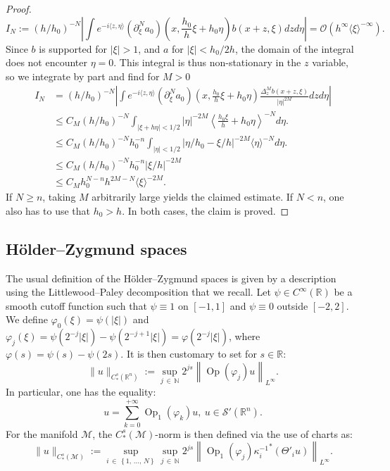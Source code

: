 \documentclass[10pt]{amsart}
\theoremstyle{definition}\newtheorem{defi}[theo]{Definition}\newtheorem{rema}[theo]{Remark}\newtheorem{exam}[theo]{Example}\newtheorem{exem}[theo]{Example}\newtheorem{nota}[theo]{Notation}
\newcommand{\R}{\mathbb{R}}
\newcommand{\N}{\mathbb{N}}
\newcommand{\M}{\mathcal{M}}
\newcommand{\clO}{\mathcal{O}}
\newcommand{\clS}{\mathcal{S}}
\DeclareMathOperator{\Op}{Op}
\begin{document}
\begin{proof}
\[
I_N :=(h/h_0)^{-N}\left| \int e^{-i \langle z, \eta \rangle } \left(\partial_\xi^N a_0\right)\left(x, \frac{h_0}{h}\xi + h_0\eta\right) b(x+z, \xi) dz d\eta \right| = \clO\left(h^\infty \langle \xi\rangle^{-\infty}\right).
\]
Since $b$ is supported for $|\xi|>1$, and $a$ for $|\xi| < h_0/2h$, the domain of the integral does not encounter $\eta = 0$. This integral is thus non-stationary in the $z$ variable, so we integrate by part and find for $M>0$
\begin{align*}
I_N &= (h/h_0)^{-N} \left| \int e^{-i \langle z, \eta \rangle } \left(\partial_\xi^N a_0\right)\left(x, \frac{h_0}{h}\xi + h_0\eta\right) \frac{\Delta_z^M b(x+z, \xi)}{|\eta|^{2M}} dz d\eta \right| \\
&\leq C_M (h/h_0)^{-N} \int_{|\xi + h\eta|< 1/2} |\eta|^{-2M} \left\langle \frac{h_0\xi}{h}+h_0\eta\right\rangle^{-N} d\eta. \\
&\leq C_M (h/h_0)^{-N} h_0^{-n} \int_{|\eta|< 1/2} \left|\eta/h_0 - \xi/h\right|^{-2M} \langle \eta \rangle^{-N} d\eta.\\
&\leq C_M (h/h_0)^{-N} h_0^{-n} |\xi/h|^{-2M} \\
&\leq C_M h_0^{N-n} h^{2M- N} \langle\xi\rangle^{-2M}.
\end{align*}
If $N \geq n$, taking $M$ arbitrarily large yields the claimed estimate. If $N < n$, one also has to use that $h_0 > h$. In both cases, the claim is proved.
\end{proof}



\subsection{H\"older--Zygmund spaces}\label{ssection:hz-spaces}



The usual definition of the H\"older--Zygmund spaces is given by a description using the Littlewood--Paley decomposition that we recall. Let $\psi \in C^\infty(\R)$ be a smooth cutoff function such that $\psi \equiv 1$ on $[-1,1]$ and $\psi \equiv 0$ outside $[-2,2]$. We define $\varphi_0(\xi) = \psi(|\xi|)$ and $\varphi_j(\xi) = \psi(2^{-j}|\xi|) - \psi(2^{-j+1}|\xi|) = \varphi(2^{-j}|\xi|)$, where $\varphi(s) = \psi(s)-\psi(2s)$. It is then customary to set for $s \in \R$:
\[
\|u\|_{C^s_*(\R^n)} := \sup_{j\,\in\,\N} 2^{js} \left\|\Op(\varphi_j)u\right\|_{L^\infty}.
\]
In particular, one has the equality:
\[
u = \sum_{k=0}^{+\infty} \Op_1(\varphi_k) u,\ u\in \clS'(\R^n).
\]
For the manifold $\M$, the $C^s_\ast(\M)$-norm is then defined via the use of charts as:
\begin{equation}\label{equation:definition-co}
\|u\|_{C^s_*(\M)} := \sup_{i\,\in\,\left\{1,\,\dots,\,N\right\}} \sup_{j\,\in\,\N} 2^{js} \left\|\Op_1(\varphi_j) {\kappa_i^{-1}}^*(\Theta'_i u)\right\|_{L^\infty}.
\end{equation}
\end{document}
